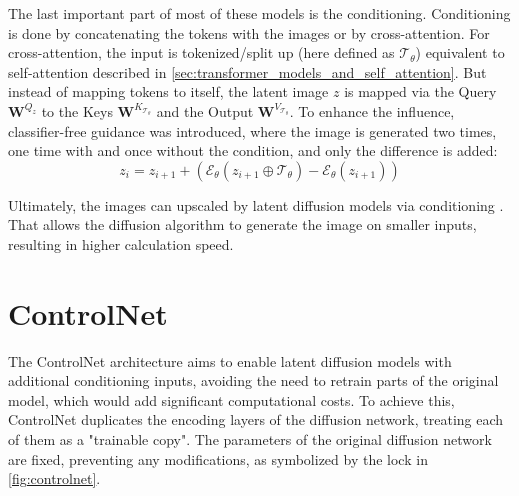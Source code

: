 The last important part of most of these models is the conditioning. Conditioning is done by concatenating the tokens with the images or by cross-attention. For cross-attention, the input is tokenized/split up (here defined as $\mathcal{T}_\theta$) equivalent to self-attention described in \autoref{sec:transformer_models_and_self_attention}. But instead of mapping tokens to itself, the latent image $z$ is mapped via the Query ${\boldsymbol{W}^{Q_z}}$ to the Keys $\boldsymbol{W}^{K_{\mathcal{T}_\theta}}$ and the Output $\boldsymbol{W}^{V_{\mathcal{T}_\theta}}$. To enhance the influence, classifier-free guidance \cite{ho2022classifierfreediffusionguidance}\cite{dieleman2022guidance} was introduced, where the image is generated two times, one time with and once without the condition, and only the difference is added:
\begin{equation}
z_i = z_{i + 1} + (\mathcal{E}_\theta(z_{i + 1} \oplus \mathcal{T}_\theta) - \mathcal{E}_\theta({z_{i + 1}}))
\end{equation}

Ultimately, the images can upscaled by latent diffusion models via conditioning \cite{rombach2022highresolution}. That allows the diffusion algorithm to generate the image on smaller inputs, resulting in higher calculation speed.

\section{ControlNet}
\label{ch:controlnet}

The ControlNet architecture \cite{zhang2023addingconditionalcontroltexttoimage} aims to enable latent diffusion models with additional conditioning inputs, avoiding the need to retrain parts of the original model, which would add significant computational costs. To achieve this, ControlNet duplicates the encoding layers of the diffusion network, treating each of them as a "trainable copy". The parameters of the original diffusion network are fixed, preventing any modifications, as symbolized by the lock in \autoref{fig:controlnet}.

